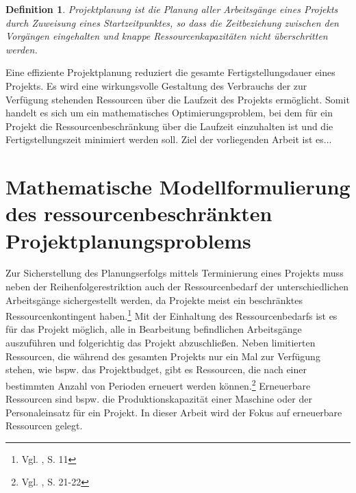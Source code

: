 \documentclass[a4paper,12pt,parskip,bibtotoc,liststotoc]{article}
\newtheorem{mydef}{Definition}
\begin{document}
\begin{mydef}
\glqq Projektplanung ist die Planung aller Arbeitsgänge eines Projekts durch Zuweisung eines Startzeitpunktes, so dass die Zeitbeziehung zwischen den Vorgängen eingehalten und knappe Ressourcenkapazitäten nicht überschritten werden.\grqq{}
\end{mydef}

Eine effiziente Projektplanung reduziert die gesamte Fertigstellungsdauer eines Projekts. Es wird eine wirkungsvolle Gestaltung des Verbrauchs der zur Verfügung stehenden Ressourcen über die Laufzeit des Projekts ermöglicht. Somit handelt es sich um ein mathematisches Optimierungsproblem, bei dem für ein Projekt die Ressourcenbeschränkung über die Laufzeit einzuhalten ist und die Fertigstellungszeit minimiert werden soll.
Ziel der vorliegenden Arbeit ist es...

\section{Mathematische Modellformulierung des ressourcenbeschränkten Projektplanungsproblems} \label{Grund}
Zur Sicherstellung des Planungserfolgs mittels Terminierung eines Projekts muss neben der Reihenfolgerestriktion auch der Ressourcenbedarf der unterschiedlichen Arbeitsgänge sichergestellt werden, da Projekte meist ein beschränktes Ressourcenkontingent haben.\footnote{Vgl. \cite{kellenbrink2014einfuhrung}, S. 11} Mit der Einhaltung des Ressourcenbedarfs ist es für das Projekt möglich, alle in Bearbeitung befindlichen Arbeitsgänge auszuführen und folgerichtig das Projekt abzuschließen. Neben limitierten Ressourcen, die während des gesamten Projekts nur ein Mal zur Verfügung stehen, wie bspw. das Projektbudget, gibt es Ressourcen, die nach einer bestimmten Anzahl von Perioden erneuert werden können.\footnote{Vgl. \cite{neumann2003project}, S. 21-22} Erneuerbare Ressourcen sind bspw. die Produktionskapazität einer Maschine oder der Personaleinsatz für ein Projekt. In dieser Arbeit wird der Fokus auf erneuerbare Ressourcen gelegt.\\
\end{document}
